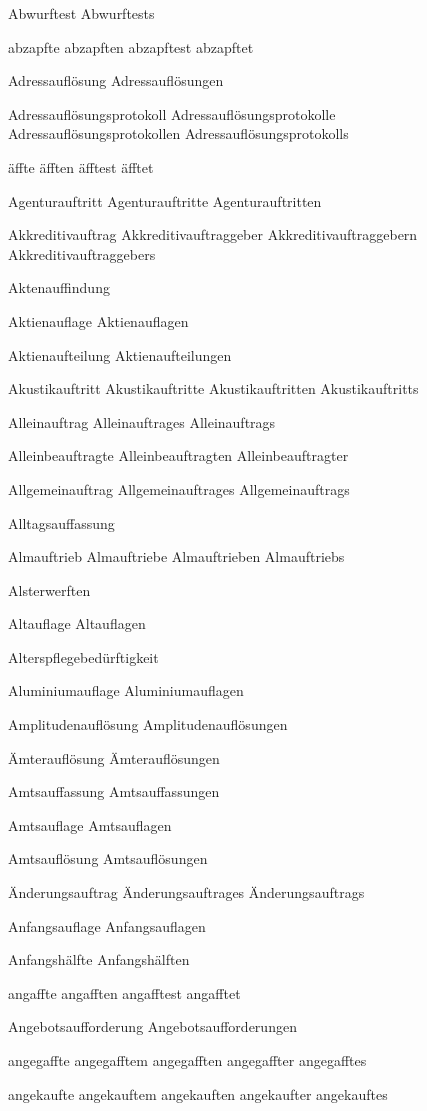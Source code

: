 Abwurftest
Abwurftests

abzapfte
abzapften
abzapftest
abzapftet

Adressauflösung
Adressauflösungen

Adressauflösungsprotokoll
Adressauflösungsprotokolle
Adressauflösungsprotokollen
Adressauflösungsprotokolls

äffte
äfften
äfftest
äfftet

Agenturauftritt
Agenturauftritte
Agenturauftritten

Akkreditivauftrag
Akkreditivauftraggeber
Akkreditivauftraggebern
Akkreditivauftraggebers

Aktenauffindung

Aktienauflage
Aktienauflagen

Aktienaufteilung
Aktienaufteilungen

Akustikauftritt
Akustikauftritte
Akustikauftritten
Akustikauftritts

Alleinauftrag
Alleinauftrages
Alleinauftrags

Alleinbeauftragte
Alleinbeauftragten
Alleinbeauftragter

Allgemeinauftrag
Allgemeinauftrages
Allgemeinauftrags

Alltagsauffassung

Almauftrieb
Almauftriebe
Almauftrieben
Almauftriebs

Alsterwerften

Altauflage
Altauflagen

Alterspflegebedürftigkeit

Aluminiumauflage
Aluminiumauflagen

Amplitudenauflösung
Amplitudenauflösungen

Ämterauflösung
Ämterauflösungen

Amtsauffassung
Amtsauffassungen

Amtsauflage
Amtsauflagen

Amtsauflösung
Amtsauflösungen

Änderungsauftrag
Änderungsauftrages
Änderungsauftrags

Anfangsauflage
Anfangsauflagen

Anfangshälfte
Anfangshälften

angaffte
angafften
angafftest
angafftet

Angebotsaufforderung
Angebotsaufforderungen

angegaffte
angegafftem
angegafften
angegaffter
angegafftes

angekaufte
angekauftem
angekauften
angekaufter
angekauftes

